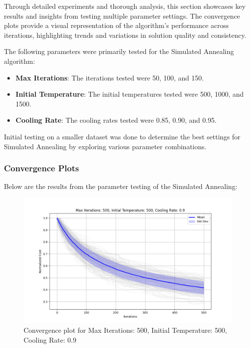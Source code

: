 \documentclass{article}
\begin{document}
    Through detailed experiments and thorough analysis, this section showcases key results and insights from testing multiple parameter settings.
    The convergence plots provide a visual representation of the algorithm’s performance across iterations, highlighting trends and variations in solution quality and consistency.

    The following parameters were primarily tested for the Simulated Annealing algorithm:

    \begin{itemize}
        \item \textbf{Max Iterations}: The iterations tested were 50, 100, and 150.
        \item \textbf{Initial Temperature}: The initial temperatures tested were 500, 1000, and 1500.
        \item \textbf{Cooling Rate}: The cooling rates tested were 0.85, 0.90, and 0.95.
    \end{itemize}

    Initial testing on a smaller dataset was done to determine the best settings for Simulated Annealing by exploring various parameter combinations.

    \subsubsection{Convergence Plots}
    Below are the results from the parameter testing of the Simulated Annealing:

    \begin{figure}[H]
        \centering
        \includegraphics[width=\textwidth]{simulated_annealing/max_iter_500_init_temp_500_cooling_rate_0.9}
        \caption{Convergence plot for Max Iterations: 500, Initial Temperature: 500, Cooling Rate: 0.9}
        \label{fig:sa_500_500_0.9}
    \end{figure}
\end{document}
